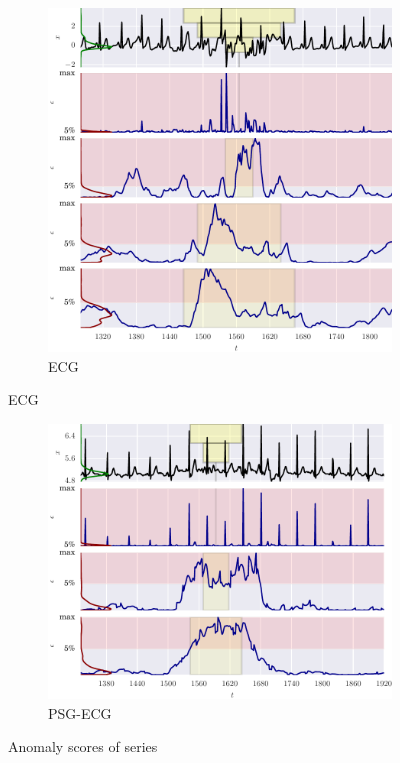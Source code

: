 \begin{figure}
    \ContinuedFloat 

    \begin{subfigure}[t]{\textwidth} 
        \centering
        \includegraphics[]{figs/er_ecg.pdf}
        \caption{ECG}
    \end{subfigure}%

\end{figure}
\begin{figure}
    \ContinuedFloat

    \begin{subfigure}[t]{\textwidth} 
        \centering
        \includegraphics[]{figs/er_sleep.pdf}
        \caption{PSG-ECG}
    \end{subfigure}%

\label{fig:err}
\caption{Anomaly scores of series} 
\end{figure}




